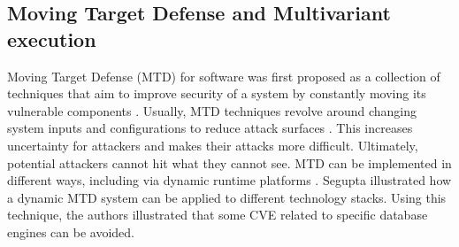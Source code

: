 \subsection*{Moving Target Defense and Multivariant execution}
\label{sota:multivariantex}

Moving Target Defense (MTD) for software was first proposed  as a collection of techniques that aim to improve security of a system by constantly moving its vulnerable components \cite{MTDNationalCyberLaep}.
Usually, MTD techniques revolve around changing system inputs and configurations to reduce attack surfaces . 
This increases uncertainty for attackers and makes their attacks more difficult. 
Ultimately, potential attackers cannot hit what they cannot see. 
MTD can be implemented in different ways, including via dynamic runtime platforms \cite{10.1145/3318216.3363338}. 
Segupta \etal illustrated how a dynamic MTD system \cite{10.5555/3091125.3091155} can be applied to different technology stacks.
Using this technique, the authors illustrated that some CVE related to specific database engines can be avoided.

